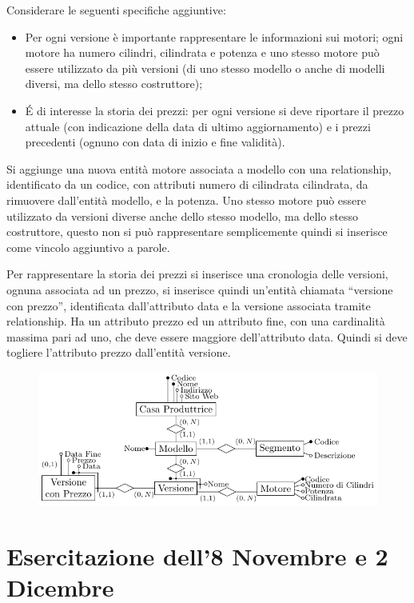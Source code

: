 \documentclass{article}
\numberwithin{equation}{subsection}
\begin{document}
Considerare le seguenti specifiche aggiuntive:
\begin{itemize}
    \item Per ogni versione è importante rappresentare le informazioni sui motori; ogni motore ha numero cilindri, cilindrata e potenza e uno stesso motore può essere 
utilizzato da più versioni (di uno stesso modello o anche di modelli diversi, ma dello stesso costruttore);
    \item \'{E} di interesse la storia dei prezzi: per ogni versione si deve riportare il prezzo attuale (con indicazione della data di ultimo aggiornamento) e i 
prezzi precedenti (ognuno con data di inizio e fine validità). 
\end{itemize}

Si aggiunge una nuova entità motore associata a modello con una relationship, identificato da un codice, con attributi numero di cilindrata cilindrata, da 
rimuovere dall'entità modello, e la potenza. Uno stesso motore può essere utilizzato da versioni diverse anche dello stesso modello, ma dello stesso costruttore, 
questo non si può rappresentare semplicemente quindi si inserisce come vincolo aggiuntivo a parole. 


Per rappresentare la storia dei prezzi si inserisce una cronologia delle versioni, ognuna associata ad un prezzo, si inserisce quindi un'entità 
chiamata ``versione con prezzo'', identificata dall'attributo data e la versione associata tramite relationship. Ha un attributo prezzo ed un 
attributo fine, con una cardinalità massima pari ad uno, che deve essere maggiore dell'attributo data. Quindi si deve togliere l'attributo prezzo 
dall'entità versione. 

\begin{figure}[H]%
    \centering%
    \includegraphics[scale=1.24]{schema_er_es_2_2.pdf}%
\end{figure}

\clearpage

\section{Esercitazione dell'8 Novembre e 2 Dicembre}
\end{document}
